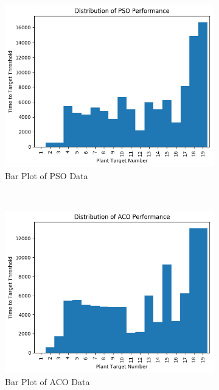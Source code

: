\documentclass{report}
\begin{document}
\begin{figure}[H]
	\begin{subfigure}{0.5\textwidth}
		\centering
		\includegraphics[width=\textwidth]{images/pso_bar}
		\caption{Bar Plot of PSO Data}
		\label{fig:psobar}
	\end{subfigure}
	~
	\begin{subfigure}{0.5\textwidth}
		\centering
		\includegraphics[width=\textwidth]{images/aco_bar}
		\caption{Bar Plot of ACO Data}
		\label{fig:acobar}
	\end{subfigure}
	~
	\begin{subfigure}{0.5\textwidth}
		\centering

\end{subfigure}
\end{figure}
\end{document}
